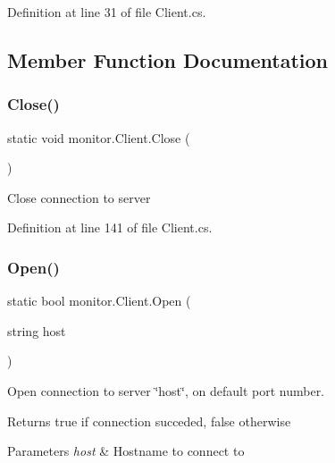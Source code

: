 Definition at line 31 of file Client.\+cs.



\subsection{Member Function Documentation}
\mbox{\label{classmonitor_1_1_client_ae6c0cbe19d622b008fd1f6d01d9cb315}} 
\subsubsection{Close()}
{\footnotesize\ttfamily static void monitor.\+Client.\+Close (\begin{DoxyParamCaption}{ }\end{DoxyParamCaption})\hspace{0.3cm}{\ttfamily [static]}}



Close connection to server 



Definition at line 141 of file Client.\+cs.

\mbox{\label{classmonitor_1_1_client_af802cd428aa08b9604e2246f11e1fe61}} 
\subsubsection{Open()\hspace{0.1cm}{\footnotesize\ttfamily [1/2]}}
{\footnotesize\ttfamily static bool monitor.\+Client.\+Open (\begin{DoxyParamCaption}\item[{string}]{host }\end{DoxyParamCaption})\hspace{0.3cm}{\ttfamily [static]}}



Open connection to server \char`\"{}host\char`\"{}, on default port number. 

\begin{DoxyReturn}{Returns}
true if connection succeded, false otherwise
\end{DoxyReturn}

\begin{DoxyParams}{Parameters}
{\em host} & Hostname to connect to\\
\hline
\end{DoxyParams}


